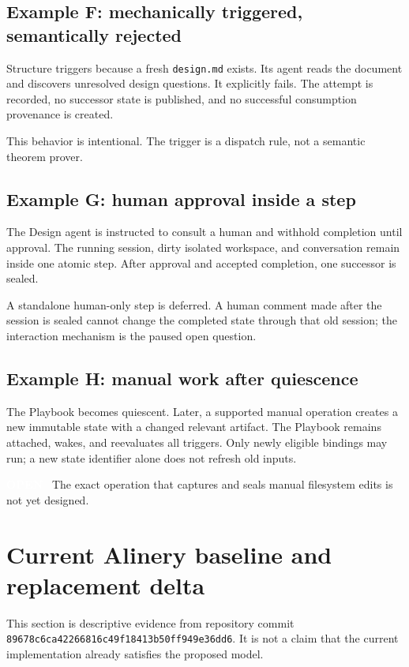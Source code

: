 \documentclass[11pt]{article}
\newcommand{\statuspill}[2]{%
  \begingroup\setlength{\fboxsep}{3pt}%
  \colorbox{#1}{\textcolor{white}{\sffamily\bfseries\scriptsize #2}}%
  \endgroup}
\newcommand{\Open}{\statuspill{Amber}{OPEN}}
\newcommand{\artifact}[1]{\texttt{#1}}
\newcommand{\baselinehash}{\texttt{89678c6ca4226681\allowbreak6c49f18413b50ff9\allowbreak49e36dd6}}
\begin{document}
\subsection{Example F: mechanically triggered, semantically rejected}

Structure triggers because a fresh \artifact{design.md} exists. Its agent reads the document and discovers unresolved design questions. It explicitly fails. The attempt is recorded, no successor state is published, and no successful consumption provenance is created.

This behavior is intentional. The trigger is a dispatch rule, not a semantic theorem prover.

\subsection{Example G: human approval inside a step}

The Design agent is instructed to consult a human and withhold completion until approval. The running session, dirty isolated workspace, and conversation remain inside one atomic step. After approval and accepted completion, one successor is sealed.

A standalone human-only step is deferred. A human comment made after the session is sealed cannot change the completed state through that old session; the interaction mechanism is the paused open question.

\subsection{Example H: manual work after quiescence}

The Playbook becomes quiescent. Later, a supported manual operation creates a new immutable state with a changed relevant artifact. The Playbook remains attached, wakes, and reevaluates all triggers. Only newly eligible bindings may run; a new state identifier alone does not refresh old inputs.

\Open\ The exact operation that captures and seals manual filesystem edits is not yet designed.

\section{Current Alinery baseline and replacement delta}

This section is descriptive evidence from repository commit \baselinehash. It is not a claim that the current implementation already satisfies the proposed model.
\end{document}

